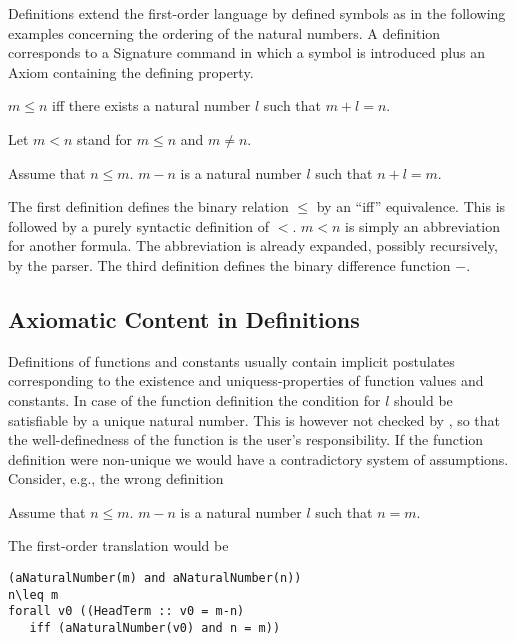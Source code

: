 \documentclass[11pt]{article}
\begin{document}
Definitions extend the first-order language by defined symbols
as in the following examples concerning the ordering
of the natural numbers. A definition corresponds to a
Signature command in which a symbol is introduced plus
an Axiom containing the defining property.

\begin{forthel}

\begin{definition} $m \leq n$ iff
there exists a natural number $l$ such that
$m + l = n$.
\end{definition}

Let $m < n$ stand for $m \leq n$ and $m \neq n$.

\begin{definition} Assume that $n \leq m$.
$m - n$ is a natural number $l$ such that $n + l  = m$.
\end{definition}

\end{forthel}

The first definition defines the binary relation $\leq$ by an
``iff'' equivalence. This is followed by a purely
syntactic definition of $<$. $m < n$ is simply an abbreviation
for another formula. The abbreviation is already expanded,
possibly recursively, by the parser. The third definition
defines the binary difference function $-$.

\subsection{Axiomatic Content in Definitions}

Definitions of functions and constants usually contain
implicit postulates corresponding to the existence
and uniquess-properties of function values and constants. In case of
the function definition the condition for $l$ should be
satisfiable by a unique natural number. This is however not
checked by \Naproche, so that the well-definedness of the
function is the user's responsibility. If the function
definition were non-unique we would have a contradictory
system of assumptions. Consider, e.g., the wrong definition

\begin{definition} Assume that $n \leq m$.
$m - n$ is a natural number $l$ such that $n = m$.
\end{definition}

The first-order translation would be

\begin{verbatim}
(aNaturalNumber(m) and aNaturalNumber(n))
n\leq m
forall v0 ((HeadTerm :: v0 = m-n)
   iff (aNaturalNumber(v0) and n = m))
\end{verbatim}
\end{document}
